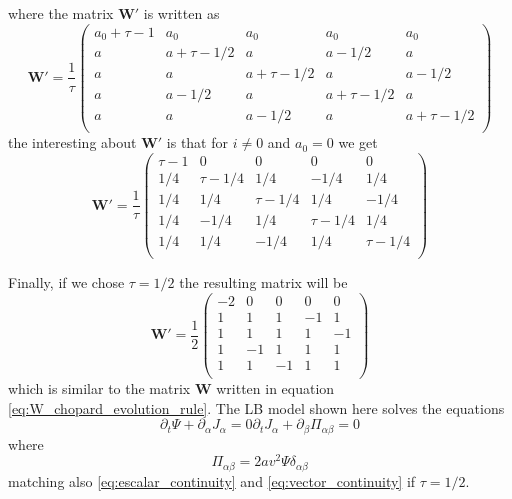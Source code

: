 where the matrix $\bm{W'}$ is written as
\begin{equation}
    \bm{W'} = \frac{1}{\tau}\begin{pmatrix}
        a_0 + \tau - 1 & a_0 & a_0 & a_0 & a_0 \\
        a & a + \tau - 1/2 & a & a - 1/2 & a \\
        a & a & a + \tau - 1/2 & a & a - 1/2 \\
        a & a - 1/2 & a & a + \tau - 1/2 & a \\
        a & a & a - 1/2 & a & a + \tau - 1/2 \\
    \end{pmatrix}
\end{equation}
the interesting about $\bm{W'}$ is that for $i\neq0$ and $a_0 = 0$ we get
\begin{equation}
    \bm{W'} = \frac{1}{\tau}\begin{pmatrix}
        \tau - 1 & 0 & 0 & 0 & 0 \\
        1/4 & \tau - 1/4 & 1/4 & -1/4 & 1/4 \\
        1/4 & 1/4 & \tau - 1/4 & 1/4 & -1/4 \\
        1/4 & -1/4 & 1/4 & \tau - 1/4 & 1/4 \\
        1/4 & 1/4 & -1/4 & 1/4 & \tau - 1/4 \\
    \end{pmatrix}
\end{equation}

Finally, if we chose $\tau=1/2$ the resulting matrix will be
\begin{equation}
    \bm{W'} = \frac{1}{2}\begin{pmatrix}
        -2 & 0 & 0 & 0 & 0 \\
        1 & 1 & 1 & -1 & 1 \\
        1 & 1 & 1 & 1 & -1 \\
        1 & -1 & 1 & 1 & 1 \\
        1 & 1 & -1 & 1 & 1 \\
    \end{pmatrix}
\end{equation}
which is similar to the matrix $\bm{W}$ written in equation \ref{eq:W_chopard_evolution_rule}. The LB model shown here solves the equations
\begin{subequations}
\begin{equation}
    \partial_t \Psi + \partial_\alpha J_\alpha = 0
\end{equation}
\begin{equation}
    \partial_t J_\alpha + \partial_\beta\Pi_{\alpha\beta} = 0
\end{equation}
\end{subequations}
where
\begin{equation}
    \Pi_{\alpha\beta} = 2av^2\Psi\delta_{\alpha\beta}
\end{equation}
matching also \ref{eq:escalar_continuity} and \ref{eq:vector_continuity} if $\tau=1/2$. 


